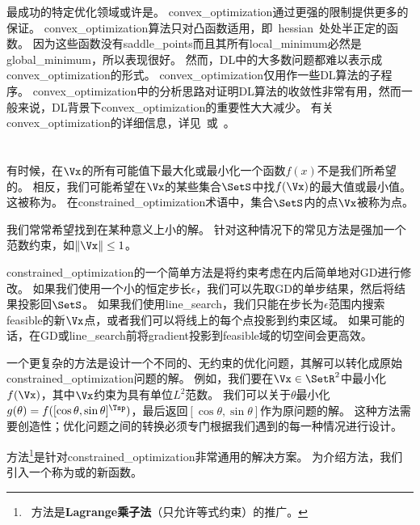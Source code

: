 
最成功的特定优化领域或许是。
\gls{convex_optimization}通过更强的限制提供更多的保证。
\gls{convex_optimization}算法只对凸函数适用，即~\gls{hessian}~处处半正定的函数。
因为这些函数没有\gls{saddle_points}而且其所有\gls{local_minimum}必然是\gls{global_minimum}，所以表现很好。
然而，\gls{DL}中的大多数问题都难以表示成\gls{convex_optimization}的形式。
\gls{convex_optimization}仅用作一些\gls{DL}算法的子程序。
\gls{convex_optimization}中的分析思路对证明\gls{DL}算法的收敛性非常有用，然而一般来说，\gls{DL}背景下\gls{convex_optimization}的重要性大大减少。 
有关\gls{convex_optimization}的详细信息，详见~\cite{Boyd04}或~\cite{rockafellar1997convex}。


\section{}
\label{sec:constrained_optimization}
有时候，在$\Vx$的所有可能值下最大化或最小化一个函数$f(x)$不是我们所希望的。
相反，我们可能希望在$\Vx$的某些集合$\SetS$中找$f(\Vx)$的最大值或最小值。
这被称为。
在\gls{constrained_optimization}术语中，集合$\SetS$内的点$\Vx$被称为点。

我们常常希望找到在某种意义上小的解。
针对这种情况下的常见方法是强加一个范数约束，如$\| \Vx \| \leq 1$。

\gls{constrained_optimization}的一个简单方法是将约束考虑在内后简单地对\gls{GD}进行修改。
如果我们使用一个小的恒定步长$\epsilon$，我们可以先取\gls{GD}的单步结果，然后将结果投影回$\SetS$。
如果我们使用\gls{line_search}，我们只能在步长为$\epsilon$范围内搜索\gls{feasible}的新$\Vx$点，或者我们可以将线上的每个点投影到约束区域。
如果可能的话，在\gls{GD}或\gls{line_search}前将\gls{gradient}投影到\gls{feasible}域的切空间会更高效\citep{rosen1960}。

一个更复杂的方法是设计一个不同的、无约束的优化问题，其解可以转化成原始\gls{constrained_optimization}问题的解。
例如，我们要在$\Vx \in \SetR^2$中最小化$f(\Vx)$，其中$\Vx$约束为具有单位$L^2$范数。
我们可以关于$\theta$最小化$g(\theta) = f([\cos \theta, \sin \theta]^\Tsp)$，最后返回$[\cos \theta, \sin \theta]$作为原问题的解。
这种方法需要创造性；优化问题之间的转换必须专门根据我们遇到的每一种情况进行设计。


方法\footnote{~方法是\textbf{Lagrange乘子法}（只允许等式约束）的推广。}是针对\gls{constrained_optimization}非常通用的解决方案。
为介绍方法，我们引入一个称为或的新函数。


